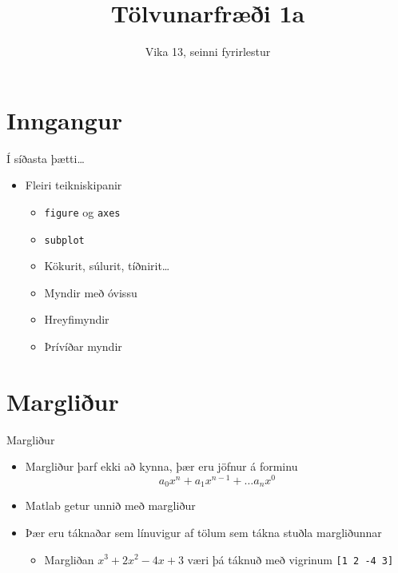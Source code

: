 \documentclass[handout]{beamer}
\title{Tölvunarfræði 1a}
\subtitle{Vika 13, seinni fyrirlestur}
\begin{document}
\begin{frame}
\titlepage
\end{frame}

\section{Inngangur}

\begin{frame}{Í síðasta þætti\ldots}
    \begin{itemize}
        \item Fleiri teikniskipanir
        \begin{itemize}
            \item \texttt{figure} og \texttt{axes}
            \item \texttt{subplot}
            \item Kökurit, súlurit, tíðnirit\ldots
            \item Myndir með óvissu
            \item Hreyfimyndir
            \item Þrívíðar myndir
        \end{itemize}
    \end{itemize}
\end{frame}

\section{Margliður}

\begin{frame}[fragile]{Margliður}
\begin{itemize}
 \item Margliður þarf ekki að kynna, þær eru jöfnur á forminu
\[
 a_0x^n + a_1x^{n-1} + \ldots a_nx^0
\]
 \item Matlab getur unnið með margliður
 \item Þær eru táknaðar sem línuvigur af tölum sem tákna stuðla margliðunnar
 \begin{itemize}
  \item Margliðan $x^3 + 2x^2 -4x +3$ væri þá táknuð með vigrinum \verb|[1 2 -4 3]|
 \end{itemize} 
\end{itemize}
\end{frame}
\end{document}
